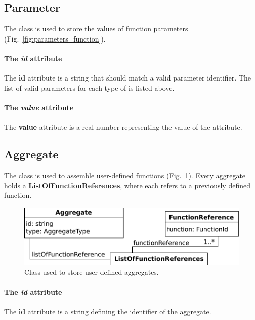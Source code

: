 \subsection{Parameter}
\label{sec:parameter}

The \parameter{} class is used to store the values of function parameters
(Fig.~\ref{fig:parameters_function}).

\paragraph{The \textit{id} attribute}
The \textbf{id} attribute is a string that should match a valid parameter
identifier.
The list of valid parameters for each type of \function{} is listed above.

\paragraph{The \textit{value} attribute}
The \textbf{value} attribute is a real number representing
the value of the attribute.


\subsection{Aggregate}
\label{sec:aggregate}

The \aggregate{} class is used to assemble user-defined functions
(Fig.~\ref{fig:parameters_aggregate}).
Every aggregate holds a \textbf{ListOfFunctionReferences},
where each \functionreference{} refers to a previously defined function.

\begin{figure}
  \centering
  \includegraphics[scale=0.9]{figures/parameters_aggregate}
  \caption{Class used to store user-defined aggregates.}
\label{fig:parameters_aggregate}
\end{figure}

\paragraph{The \textit{id} attribute}
The \textbf{id} attribute is a string defining the identifier of the aggregate.

